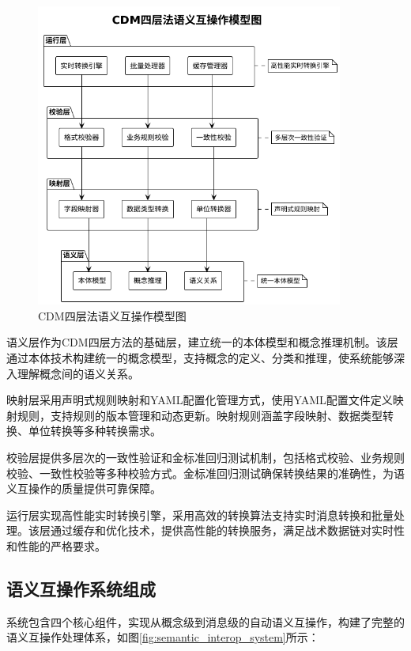 \begin{figure}[H]
    \centering
    \includegraphics[width=0.9\textwidth]{chapters/fig-0/cdm_four_layer_simple.png}
    \caption{CDM四层法语义互操作模型图}
    \label{fig:cdm_four_layer}
\end{figure}

语义层作为CDM四层方法的基础层，建立统一的本体模型和概念推理机制。该层通过本体技术构建统一的概念模型，支持概念的定义、分类和推理，使系统能够深入理解概念间的语义关系。

映射层采用声明式规则映射和YAML配置化管理方式，使用YAML配置文件定义映射规则，支持规则的版本管理和动态更新。映射规则涵盖字段映射、数据类型转换、单位转换等多种转换需求。

校验层提供多层次的一致性验证和金标准回归测试机制，包括格式校验、业务规则校验、一致性校验等多种校验方式。金标准回归测试确保转换结果的准确性，为语义互操作的质量提供可靠保障。

运行层实现高性能实时转换引擎，采用高效的转换算法支持实时消息转换和批量处理。该层通过缓存和优化技术，提供高性能的转换服务，满足战术数据链对实时性和性能的严格要求。

\subsection{语义互操作系统组成}

系统包含四个核心组件，实现从概念级到消息级的自动语义互操作，构建了完整的语义互操作处理体系，如图\ref{fig:semantic_interop_system}所示：

